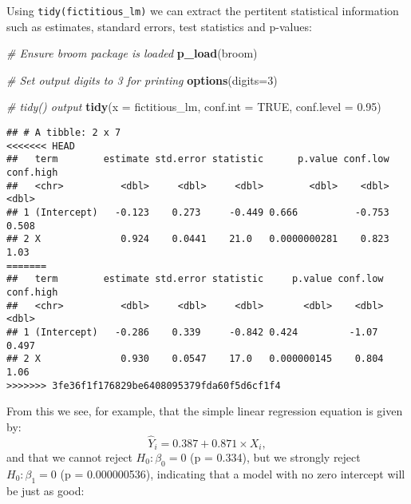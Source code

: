\documentclass[
]{book}
\newenvironment{Shaded}{\begin{snugshade}}{\end{snugshade}}
\newcommand{\CommentTok}[1]{\textcolor[rgb]{0.56,0.35,0.01}{\textit{#1}}}
\newcommand{\DataTypeTok}[1]{\textcolor[rgb]{0.13,0.29,0.53}{#1}}
\newcommand{\DecValTok}[1]{\textcolor[rgb]{0.00,0.00,0.81}{#1}}
\newcommand{\FloatTok}[1]{\textcolor[rgb]{0.00,0.00,0.81}{#1}}
\newcommand{\KeywordTok}[1]{\textcolor[rgb]{0.13,0.29,0.53}{\textbf{#1}}}
\newcommand{\NormalTok}[1]{#1}
\newcommand{\OperatorTok}[1]{\textcolor[rgb]{0.81,0.36,0.00}{\textbf{#1}}}
\newcommand{\OtherTok}[1]{\textcolor[rgb]{0.56,0.35,0.01}{#1}}
\newcommand{\StringTok}[1]{\textcolor[rgb]{0.31,0.60,0.02}{#1}}
\begin{document}
Using \texttt{tidy(fictitious\_lm)} we can extract the pertitent statistical information such as estimates, standard errors, test statistics and p-values:

\begin{Shaded}
\begin{Highlighting}[]
\CommentTok{# Ensure broom package is loaded}
\KeywordTok{p_load}\NormalTok{(broom)}

\CommentTok{# Set output digits to 3 for printing}
\KeywordTok{options}\NormalTok{(}\DataTypeTok{digits=}\DecValTok{3}\NormalTok{)}

\CommentTok{# tidy() output}
\KeywordTok{tidy}\NormalTok{(}\DataTypeTok{x =}\NormalTok{ fictitious_lm,}
     \DataTypeTok{conf.int =} \OtherTok{TRUE}\NormalTok{,}
     \DataTypeTok{conf.level =} \FloatTok{0.95}\NormalTok{)}
\end{Highlighting}
\end{Shaded}

\begin{verbatim}
## # A tibble: 2 x 7
<<<<<<< HEAD
##   term        estimate std.error statistic      p.value conf.low conf.high
##   <chr>          <dbl>     <dbl>     <dbl>        <dbl>    <dbl>     <dbl>
## 1 (Intercept)   -0.123    0.273     -0.449 0.666          -0.753     0.508
## 2 X              0.924    0.0441    21.0   0.0000000281    0.823     1.03
=======
##   term        estimate std.error statistic     p.value conf.low conf.high
##   <chr>          <dbl>     <dbl>     <dbl>       <dbl>    <dbl>     <dbl>
## 1 (Intercept)   -0.286    0.339     -0.842 0.424         -1.07      0.497
## 2 X              0.930    0.0547    17.0   0.000000145    0.804     1.06
>>>>>>> 3fe36f1f176829be6408095379fda60f5d6cf1f4
\end{verbatim}

From this we see, for example, that the simple linear regression equation is given by:
\[
\hat Y_i = 0.387 + 0.871\times X_i,  
\]
and that we cannot reject \(H_0: \beta_0=0\) (p = 0.334), but we strongly reject \(H_0:\beta_1 = 0\) (p = 0.000000536), indicating that a model with no zero intercept will be just as good:

\begin{Shaded}
\end{Shaded}
\end{document}
